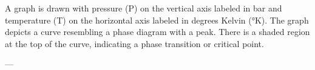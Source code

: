 A graph is drawn with pressure (P) on the vertical axis labeled in bar and temperature (T) on the horizontal axis labeled in degrees Kelvin (°K). The graph depicts a curve resembling a phase diagram with a peak. There is a shaded region at the top of the curve, indicating a phase transition or critical point.

---